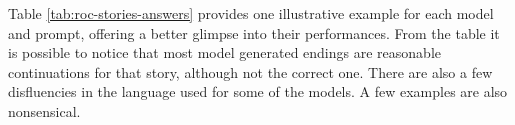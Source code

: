 

Table \ref{tab:roc-stories-answers} provides one illustrative example for each model and prompt, offering a better glimpse into their performances.  From the table it is possible to notice that most model generated endings are reasonable continuations for that story, although not the correct one. There are also a few disfluencies in the language used for some of the models. A few examples are also nonsensical.
% 

